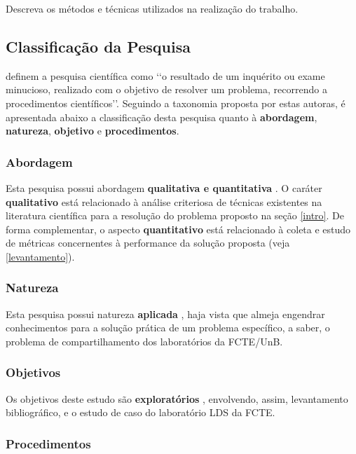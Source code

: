 \documentclass[12pt]{article}
\begin{document}
Descreva os métodos e técnicas utilizados na realização do trabalho.

\subsection{Classificação da Pesquisa}
\label{test}

 definem a pesquisa científica como \lq\lq o resultado de um inquérito ou exame minucioso, realizado com o objetivo de resolver um problema, recorrendo a procedimentos científicos\rq\rq. Seguindo a taxonomia proposta por estas autoras, é apresentada abaixo a classificação desta pesquisa quanto à \textbf{abordagem}, \textbf{natureza}, \textbf{objetivo} e \textbf{procedimentos}.

\subsubsection{Abordagem}

Esta pesquisa possui abordagem \textbf{qualitativa e quantitativa} \cite[p. ~33-36]{gerhardt_silveira}. O caráter \textbf{qualitativo} está relacionado à análise criteriosa de técnicas existentes na literatura científica para a resolução do problema proposto na seção \ref{intro}. De forma complementar, o aspecto \textbf{quantitativo} está relacionado à coleta e estudo de métricas concernentes à performance da solução proposta (veja \ref{levantamento}).

\subsubsection{Natureza}

Esta pesquisa possui natureza \textbf{aplicada} \cite[p. ~36-37]{gerhardt_silveira}, haja vista que almeja engendrar conhecimentos para a solução prática de um problema específico, a saber, o problema de compartilhamento dos laboratórios da FCTE/UnB.

\subsubsection{Objetivos}

Os objetivos deste estudo são \textbf{exploratórios} \cite[p.~37-38]{gerhardt_silveira}, envolvendo, assim, levantamento bibliográfico, e o estudo de caso do laboratório LDS da FCTE.

\subsubsection{Procedimentos}
\end{document}
